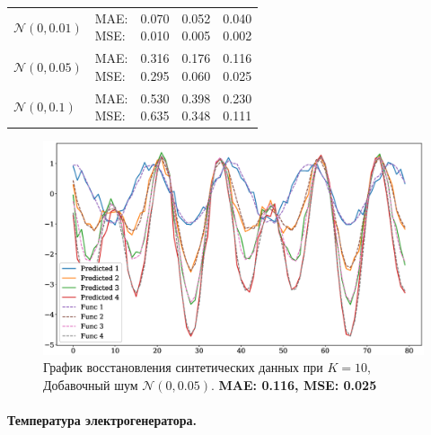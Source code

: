\documentclass{article}
\begin{document}
\def\arraystretch{2.3}
\begin{tabular}{|l||l||*{3}{c|}}\hline
	\backslashbox{Шум}{Параметры}
	&\makebox[3em]{Метрика}&\makebox[3em]{$K=2$}&\makebox[3em]{$K=4$}&\makebox[3em]{$K=10$}\\\hline
	$\mathcal{N}(0, 0.01)$&\makecell{ MAE: \\ MSE: } &\makecell{ 0.070 \\ 0.010 }&\makecell{ 0.052 \\ 0.005 }&\makecell{ 0.040 \\ 0.002 }\\\hline
	$\mathcal{N}(0, 0.05)$&\makecell{ MAE: \\ MSE: } &\makecell{ 0.316 \\ 0.295 }&\makecell{ 0.176 \\ 0.060 }&\makecell{ 0.116 \\ 0.025 }\\\hline
	$\mathcal{N}(0, 0.1)$& \makecell{ MAE: \\ MSE: } &\makecell{ 0.530 \\ 0.635 }&\makecell{ 0.398 \\ 0.348 }&\makecell{ 0.230 \\ 0.111 }\\\hline
\end{tabular}


\begin{figure}[H]
	\centering
	\includegraphics[width=\textwidth]{synthetic_time_series_K10N005.eps}
	\caption{График восстановления синтетических данных при $K=10$, Добавочный шум $\mathcal{N}(0, 0.05)$. \textbf{MAE: 0.116, MSE: 0.025}}
	\label{fig:fig6}
\end{figure}

\paragraph{Температура электрогенератора.}\
\end{document}
